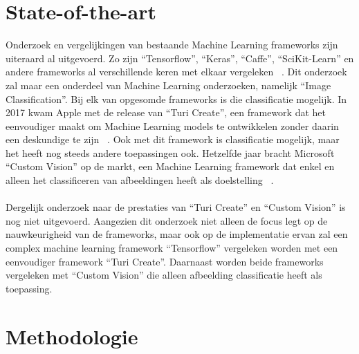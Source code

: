 \section{State-of-the-art}
\label{sec:state-of-the-art}

Onderzoek en vergelijkingen van bestaande Machine Learning frameworks zijn uiteraard al uitgevoerd. Zo zijn “Tensorflow”, “Keras”, “Caffe”, “SciKit-Learn” en andere frameworks al verschillende keren met elkaar vergeleken ~\autocite{Deeplearning}.
Dit onderzoek zal maar een onderdeel van Machine Learning onderzoeken, namelijk “Image Classification”. Bij elk van opgesomde frameworks is die classificatie mogelijk. In 2017 kwam Apple met de release van “Turi Create”, een framework dat het eenvoudiger maakt om Machine Learning models te ontwikkelen zonder daarin een deskundige te zijn ~\autocite{9to5}. 
Ook met dit framework is classificatie mogelijk, maar het heeft nog steeds andere toepassingen ook. Hetzelfde jaar bracht Microsoft “Custom Vision” op de markt, een Machine Learning framework dat enkel en alleen het classificeren van afbeeldingen heeft als doelstelling ~\autocite{Microsoft}.
\\~\\
Dergelijk onderzoek naar de prestaties van “Turi Create” en “Custom Vision” is nog niet uitgevoerd. Aangezien dit onderzoek niet alleen de focus legt op de nauwkeurigheid van de frameworks, maar ook op de implementatie ervan zal een complex machine learning framework “Tensorflow” vergeleken worden met een eenvoudiger framework “Turi Create”. Daarnaast worden beide frameworks vergeleken met “Custom Vision” die alleen afbeelding classificatie heeft als toepassing. 


\section{Methodologie}
\label{sec:methodologie}

